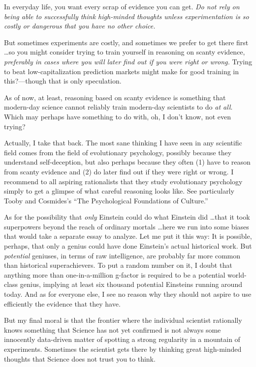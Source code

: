 {
 In everyday life, you want every scrap of evidence you can get.
\textit{Do not rely on being able to successfully think high-minded
thoughts unless experimentation is so costly or dangerous that you have
no other choice.}}

{
 But sometimes experiments are costly, and sometimes we prefer to
get there first \ldots so you might consider trying to train yourself in
reasoning on scanty evidence, \textit{preferably in cases where you
will later find out if you were right or wrong.} Trying to beat
low-capitalization prediction markets might make for good training in
this?---though that is only speculation.}

{
 As of now, at least, reasoning based on scanty evidence is
something that modern-day science cannot reliably train modern-day
scientists to do \textit{at all}. Which may perhaps have something to
do with, oh, I don't know, not even trying?}

{
 Actually, I take that back. The most sane thinking I have seen in
any scientific field comes from the field of evolutionary psychology,
possibly because they understand self-deception, but also perhaps
because they often (1) have to reason from scanty evidence and (2) do
later find out if they were right or wrong. I recommend to all aspiring
rationalists that they study evolutionary psychology simply to get a
glimpse of what careful reasoning looks like. See particularly Tooby
and Cosmides's ``The Psychological
Foundations of Culture.''}

{
 As for the possibility that \textit{only} Einstein could do what
Einstein did \ldots that it took superpowers beyond the reach of
ordinary mortals \ldots here we run into some biases that would take a
separate essay to analyze. Let me put it this way: It is possible,
perhaps, that only a genius could have done Einstein's
actual historical work. But \textit{potential} geniuses, in terms of
raw intelligence, are probably far more common than historical
superachievers. To put a random number on it, I doubt that anything
more than one-in-a-million g-factor is required to be a potential
world-class genius, implying at least six thousand potential Einsteins
running around today. And as for everyone else, I see no reason why
they should not aspire to use efficiently the evidence that they have.}

{
 But my final moral is that the frontier where the individual
scientist rationally knows something that Science has not yet confirmed
is not always some innocently data-driven matter of spotting a strong
regularity in a mountain of experiments. Sometimes the scientist gets
there by thinking great high-minded thoughts that Science does not
trust you to think.}

